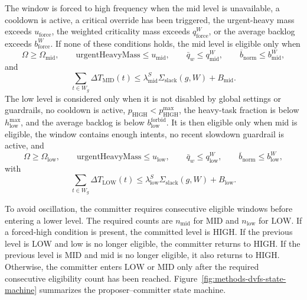 The window is forced to high frequency when the mid level is unavailable, a cooldown is active, a critical override has been triggered, the urgent-heavy mass exceeds $u_{\mathrm{force}}$, the weighted criticality mass exceeds $q_{\mathrm{force}}^{W}$, or the average backlog exceeds $b_{\mathrm{force}}^{W}$. If none of these conditions holds, the mid level is eligible only when
\begin{equation}
\Omega\geq\Omega_{\mathrm{mid}},
\qquad
\mathrm{urgentHeavyMass}\leq u_{\mathrm{mid}},
\qquad
\bar{q}_{w}\leq q_{\mathrm{mid}}^{W},
\qquad
\overline{b}_{\mathrm{norm}}\leq b_{\mathrm{mid}}^{W},
\end{equation}
and
\begin{equation}
\sum_{t\in W_g}\Delta T_{\mathrm{MID}}(t)
\leq
\lambda_{\mathrm{mid}}^{S}\Sigma_{\mathrm{slack}}(g,W)+B_{\mathrm{mid}}.
\end{equation}
The low level is considered only when it is not disabled by global settings or guardrails, no cooldown is active, $p_{\mathrm{HIGH}}<p_{\mathrm{HIGH}}^{\max}$, the heavy-task fraction is below $h_{\mathrm{low}}^{\max}$, and the average backlog is below $b_{\mathrm{low}}^{\mathrm{forbid}}$. It is then eligible only when mid is eligible, the window contains enough intents, no recent slowdown guardrail is active, and
\begin{equation}
\Omega\geq\Omega_{\mathrm{low}},
\qquad
\mathrm{urgentHeavyMass}\leq u_{\mathrm{low}},
\qquad
\bar{q}_{w}\leq q_{\mathrm{low}}^{W},
\qquad
\overline{b}_{\mathrm{norm}}\leq b_{\mathrm{low}}^{W},
\end{equation}
with
\begin{equation}
\sum_{t\in W_g}\Delta T_{\mathrm{LOW}}(t)
\leq
\lambda_{\mathrm{low}}^{S}\Sigma_{\mathrm{slack}}(g,W)+B_{\mathrm{low}}.
\end{equation}

To avoid oscillation, the committer requires consecutive eligible windows before entering a lower level. The required counts are $n_{\mathrm{mid}}$ for $\mathrm{MID}$ and $n_{\mathrm{low}}$ for $\mathrm{LOW}$. If a forced-high condition is present, the committed level is $\mathrm{HIGH}$. If the previous level is $\mathrm{LOW}$ and low is no longer eligible, the committer returns to $\mathrm{HIGH}$. If the previous level is $\mathrm{MID}$ and mid is no longer eligible, it also returns to $\mathrm{HIGH}$. Otherwise, the committer enters $\mathrm{LOW}$ or $\mathrm{MID}$ only after the required consecutive eligibility count has been reached. Figure~\ref{fig:methods-dvfs-state-machine} summarizes the proposer--committer state machine.

